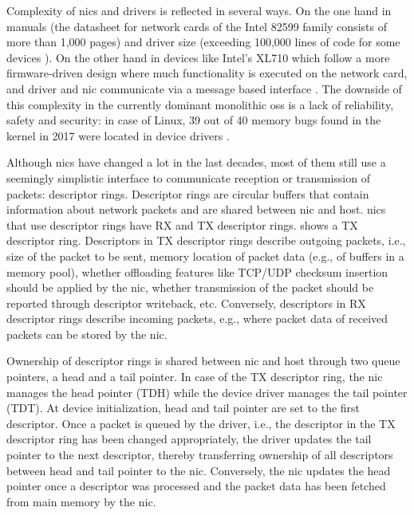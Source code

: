 Complexity of \acp{nic} and drivers is reflected in several ways. On the one
hand in manuals (the datasheet for network cards of the Intel 82599 family
\cite{intel2019datasheet} consists of more than 1,000 pages) and driver size
(exceeding 100,000 lines of code for some devices \cite{emmerich2019case}). On
the other hand in devices like Intel's XL710 which follow a more firmware-driven
design where much functionality is executed on the network card, and driver and
\ac{nic} communicate via a message based interface \cite{emmerich2019user}. The
downside of this complexity in the currently dominant monolithic \aclp{os} is a
lack of reliability, safety and security: in case of Linux, 39 out of 40 memory
bugs found in the kernel in 2017 were located in device drivers
\cite{emmerich2019case}.

Although \acp{nic} have changed a lot in the last decades, most of them still
use a seemingly simplistic interface to communicate reception or transmission of
packets: descriptor rings. Descriptor rings are circular buffers that contain
information about network packets and are shared between \ac{nic} and host.
\acp{nic} that use descriptor rings have RX and TX descriptor rings.
 shows a TX descriptor ring. Descriptors in TX descriptor
rings describe outgoing packets, i.e., size of the packet to be sent, memory
location of packet data (e.g., of buffers in a memory pool), whether offloading
features like TCP/UDP checksum insertion should be applied by the \ac{nic},
whether transmission of the packet should be reported through descriptor
writeback, etc. Conversely, descriptors in RX descriptor rings describe incoming
packets, e.g., where packet data of received packets can be stored by the
\ac{nic}.

Ownership of descriptor rings is shared between \ac{nic} and host through two
queue pointers, a head and a tail pointer. In case of the TX descriptor ring,
the \ac{nic} manages the head pointer (TDH) while the device driver manages the
tail pointer (TDT). At device initialization, head and tail pointer are set to
the first descriptor. Once a packet is queued by the driver, i.e., the
descriptor in the TX descriptor ring has been changed appropriately, the driver
updates the tail pointer to the next descriptor, thereby transferring ownership
of all descriptors between head and tail pointer to the \ac{nic}. Conversely,
the \ac{nic} updates the head pointer once a descriptor was processed and the
packet data has been fetched from main memory by the \ac{nic}.

